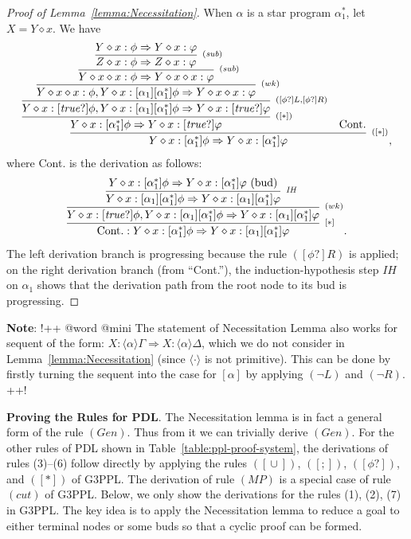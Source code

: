 \documentclass[manuscript,screen]{acmart}
\newcommand{\la}[0]{\langle}
\newcommand{\ra}[0]{\rangle}
\newcommand{\true}[0]{\mathit{true}}
\DeclareMathOperator{\seq}{;}
\DeclareMathOperator{\cho}{\cup}
\newcommand{\Sub}[0]{{\textit{sub}}}
\newcommand{\lup}[0]{*}
\newcommand{\cat}[0]{\diamond}
\newcommand{\GiiiPPLcyc}[0]{\mbox{G3PPL}}
\begin{document}
\begin{proof}[Proof of Lemma~\ref{lemma:Necessitation}]
When $\alpha$ is a star program $\alpha^*_1$, let $X = Y\cat x$. We have
$$
\infer[^{([\lup])}]
{Y\cat x:[\alpha^*_1]\phi\Rightarrow Y\cat x:[\alpha^*_1]\varphi}
{
    \infer[^{([\lup])}]
    {Y\cat x:[\alpha^*_1]\phi\Rightarrow Y\cat x:[\true?]\varphi}
    {   
        \infer[^{([\phi?]L, [\phi?]R)}]
        {Y\cat x:[\true?]\phi, Y\cat x:[\alpha_1][\alpha^*_1]\phi\Rightarrow Y\cat x:[\true?]\varphi}
        {
            \infer[^{(wk)}]
            {Y\cat x\cat x : \phi, Y\cat x : [\alpha_1][\alpha^\lup_1]\phi\Rightarrow Y\cat x\cat x:\varphi}
            {
                \infer[^{(\Sub)}]
                {Y\cat x\cat x : \phi\Rightarrow Y\cat x\cat x : \varphi}
                {
                    \infer[^{(\Sub)}]
                    {Z\cat x : \phi\Rightarrow Z\cat x : \varphi}
                    {Y \cat x : \phi\Rightarrow Y\cat x : \varphi}
                }
            }
        }
    }
    &
    \mbox{Cont.}
}, 
$$
where \mbox{Cont.} is the derivation as follows:
$$
\infer[^{[\lup]}]
{\mbox{Cont.} : Y\cat x : [\alpha^*_1]\phi \Rightarrow Y\cat x : [\alpha_1][\alpha^*_1]\varphi}
{
    \infer[^{(wk)}]
    {Y\cat x:[\true?]\phi, Y\cat x:[\alpha_1][\alpha^*_1]\phi\Rightarrow Y\cat x : [\alpha_1][\alpha^*_1]\varphi}
    {
        \infer[^{\textit{IH}}]
        {Y\cat x:[\alpha_1][\alpha^*_1]\phi\Rightarrow Y\cat x : [\alpha_1][\alpha^*_1]\varphi}
        {
            Y\cat x : [\alpha^*_1]\phi\Rightarrow Y\cat x : [\alpha^*_1]\varphi \mbox{ (bud)}
        }
    }
}. 
$$
The left derivation branch is progressing because the rule $([\phi?]R)$ is applied; on the right derivation branch (from ``Cont.''), the induction-hypothesis step $\textit{IH}$ on $\alpha_1$ shows that the derivation path from the root node to its bud is progressing. 
\end{proof}

\ifx
\textbf{Note}: 
!++
@word @mini
The statement of Necessitation Lemma also works for sequent of the form: $X:\la\alpha\ra\Gamma\Rightarrow X:\la\alpha\ra\Delta$, which we do not consider in Lemma~\ref{lemma:Necessitation} (since $\la \cdot\ra$ is not primitive). 
This can be done by firstly turning the sequent into the case for $[\alpha]$ by applying $(\neg L)$ and $(\neg R)$. 
++!
\fi

\textbf{Proving the Rules for PDL}. 
The Necessitation lemma is in fact a general form of the rule $(\textit{Gen})$. 
Thus from it we can trivially derive $(\textit{Gen})$. 
For the other rules of PDL shown in Table~\ref{table:ppl-proof-system}, the derivations of rules (3)--(6) follow directly by applying the rules $([\cho])$, $([\seq])$, $([\phi?])$, and $([\lup])$ of \GiiiPPLcyc. 
The derivation of rule $(\textit{MP})$ is a special case of rule $(cut)$ of \GiiiPPLcyc. 
Below, we only show the derivations for the rules (1), (2), (7) in \GiiiPPLcyc. 
The key idea is to apply the Necessitation lemma to reduce a goal to either terminal nodes or some buds so that a cyclic proof can be formed. 
\end{document}
